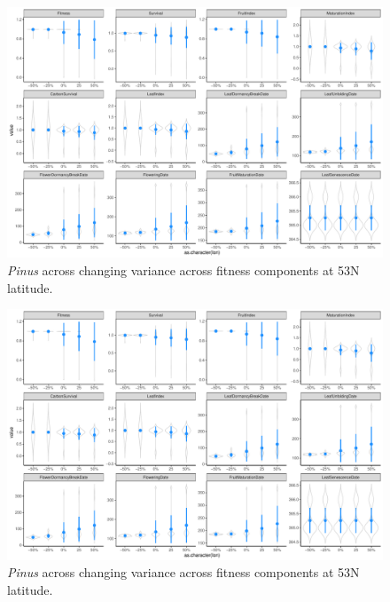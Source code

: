\documentclass[11pt,letter]{article}
\begin{document}
\begin{figure} 
 \begin{center}
\noindent \includegraphics[width=1\textwidth]{..//analyses/graphs/phenofit/sims/sdsim53_allmetricsPS.pdf}
  \caption{\emph{Pinus} across changing variance across fitness components at 53\degree N latitude. }
  \label{fig:pinussd53}
  \end{center}
\end{figure}

\begin{figure} 
 \begin{center}
\noindent \includegraphics[width=1\textwidth]{..//analyses/graphs/phenofit/sims/sdsim53_allmetricsPS.pdf}
  \caption{\emph{Pinus} across changing variance across fitness components at 53\degree N latitude. }
  \label{fig:pinussd53}
  \end{center}
\end{figure}
\end{document}
